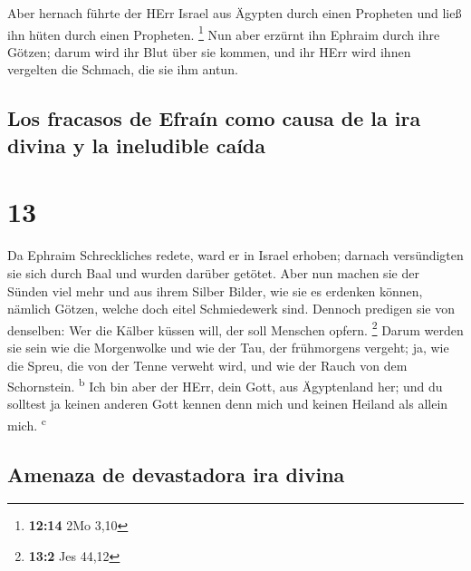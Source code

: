  Aber hernach führte der HErr Israel aus Ägypten durch
einen Propheten und ließ ihn hüten durch einen Propheten. \footnote{\textbf{12:14}
  2Mo 3,10}  Nun aber erzürnt ihn Ephraim durch ihre
Götzen; darum wird ihr Blut über sie kommen, und ihr HErr wird ihnen
vergelten die Schmach, die sie ihm antun.

\hypertarget{los-fracasos-de-efrauxedn-como-causa-de-la-ira-divina-y-la-ineludible-cauxedda}{%
\subsection{Los fracasos de Efraín como causa de la ira divina y la
ineludible
caída}\label{los-fracasos-de-efrauxedn-como-causa-de-la-ira-divina-y-la-ineludible-cauxedda}}

\hypertarget{section-12}{%
\section{13}\label{section-12}}

 Da Ephraim Schreckliches redete, ward er in Israel
erhoben; darnach versündigten sie sich durch Baal und wurden darüber
getötet.  Aber nun machen sie der Sünden viel mehr und aus
ihrem Silber Bilder, wie sie es erdenken können, nämlich Götzen, welche
doch eitel Schmiedewerk sind. Dennoch predigen sie von denselben: Wer
die Kälber küssen will, der soll Menschen opfern. \footnote{\textbf{13:2}
  Jes 44,12}  Darum werden sie sein wie die Morgenwolke
und wie der Tau, der frühmorgens vergeht; ja, wie die Spreu, die von der
Tenne verweht wird, und wie der Rauch von dem Schornstein.
\textsuperscript{b}  Ich bin aber der HErr, dein Gott, aus
Ägyptenland her; und du solltest ja keinen anderen Gott kennen denn mich
und keinen Heiland als allein mich. \textsuperscript{c}

\hypertarget{amenaza-de-devastadora-ira-divina}{%
\subsection{Amenaza de devastadora ira
divina}\label{amenaza-de-devastadora-ira-divina}}

